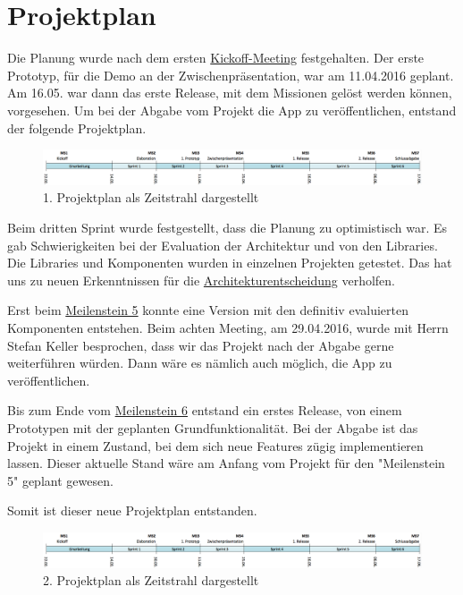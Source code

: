 


\section{Projektplan}

Die Planung wurde nach dem ersten \hyperref[pm-ms1]{Kickoff-Meeting} festgehalten. 
Der erste Prototyp, für die Demo an der Zwischenpräsentation, war am 11.04.2016 geplant. 
Am 16.05. war dann das erste Release, mit dem Missionen gelöst werden können, vorgesehen. 
Um bei der Abgabe vom Projekt die App zu veröffentlichen, entstand der folgende Projektplan.

\begin{figure}[H]
	\centering
	\includegraphics[width=\textwidth]{images/projektmanagement/zeitstrahl_v1.png}
	\caption{1. Projektplan als Zeitstrahl dargestellt}
	\label{image-project-plan-timeline1}
\end{figure}

Beim dritten Sprint wurde festgestellt, dass die Planung zu optimistisch war. 
Es gab Schwierigkeiten bei der Evaluation der Architektur und von den Libraries. 
Die Libraries und Komponenten wurden in einzelnen Projekten getestet. 
Das hat uns zu neuen Erkenntnissen für die \hyperref[tb-evaluation-architektur]{Architekturentscheidung} verholfen. 

Erst beim \hyperref[pm-ms5]{Meilenstein 5} konnte eine Version mit den definitiv evaluierten Komponenten entstehen. 
Beim achten Meeting, am 29.04.2016, wurde mit Herrn Stefan Keller besprochen, dass wir das Projekt nach der Abgabe gerne weiterführen würden.
Dann wäre es nämlich auch möglich, die App zu veröffentlichen.

Bis zum Ende vom \hyperref[pm-ms6]{Meilenstein 6} entstand ein erstes Release, von einem Prototypen mit der geplanten Grundfunktionalität. 
Bei der Abgabe ist das Projekt in einem Zustand, bei dem sich neue Features zügig implementieren lassen.
Dieser aktuelle Stand wäre am Anfang vom Projekt für den "Meilenstein 5" geplant gewesen.

Somit ist dieser neue Projektplan entstanden.

\begin{figure}[H]
	\centering
	\includegraphics[width=\textwidth]{images/projektmanagement/zeitstrahl_v1.png}
	\caption{2. Projektplan als Zeitstrahl dargestellt}
	\label{image-project-plan-timeline2}
\end{figure}

